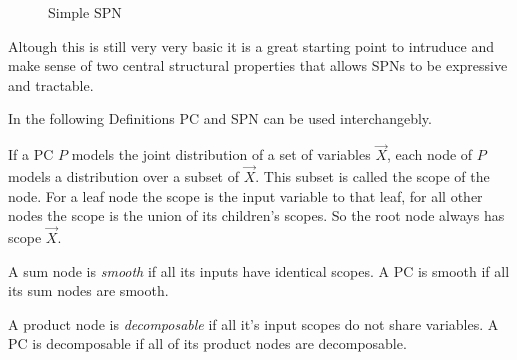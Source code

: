 \begin{figure}[h!]
    \centering
    \caption{Simple SPN}
    \label{fig:spn_layered}
\end{figure}

Altough this is still very very basic it is a great starting point to intruduce and make sense of two central structural 
properties that allows SPNs to be expressive and tractable. 

In the following Definitions PC and SPN can be used interchangebly.

\begin{definition}[Scope]
    If a PC $P$ models the joint distribution of a set of variables $\vec{X}$, each node of $P$ models a distribution over a subset of $\vec{X}$.
    This subset is called the scope of the node. For a leaf node the scope is the input variable to that leaf, for all other nodes the scope 
    is the union of its children's scopes. So the root node always has scope $\vec{X}$. \cite{pc_intro}
\end{definition}

\begin{definition}[Smoothness]
    A sum node is \textit{smooth} if all its inputs have identical scopes. A PC is smooth if all its sum nodes are smooth. \cite{pc_intro}
\end{definition}
\begin{definition}[Decomposability]
    A product node is \textit{decomposable} if all it's input scopes do not share variables. A PC is decomposable if all of its product nodes are decomposable. \cite{pc_intro}
\end{definition}

